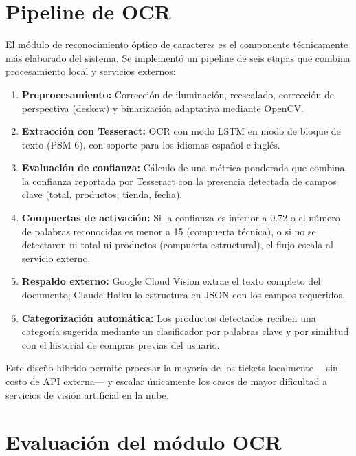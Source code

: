 \section{Pipeline de OCR}

El módulo de reconocimiento óptico de caracteres es el componente
técnicamente más elaborado del sistema. Se implementó un pipeline
de seis etapas que combina procesamiento local y servicios externos:

\begin{enumerate}
  \item \textbf{Preprocesamiento:} Corrección de iluminación,
    reescalado, corrección de perspectiva (deskew) y binarización
    adaptativa mediante OpenCV.
  \item \textbf{Extracción con Tesseract:} OCR con modo LSTM en
    modo de bloque de texto (PSM 6), con soporte para los idiomas
    español e inglés.
  \item \textbf{Evaluación de confianza:} Cálculo de una métrica
    ponderada que combina la confianza reportada por Tesseract con la
    presencia detectada de campos clave (total, productos, tienda, fecha).
  \item \textbf{Compuertas de activación:} Si la confianza es inferior
    a 0.72 o el número de palabras reconocidas es menor a 15
    (compuerta técnica), o si no se detectaron ni total ni productos
    (compuerta estructural), el flujo escala al servicio externo.
  \item \textbf{Respaldo externo:} Google Cloud Vision extrae el texto
    completo del documento; Claude Haiku lo estructura en JSON con los
    campos requeridos.
  \item \textbf{Categorización automática:} Los productos detectados
    reciben una categoría sugerida mediante un clasificador por palabras
    clave y por similitud con el historial de compras previas del usuario.
\end{enumerate}

Este diseño híbrido permite procesar la mayoría de los tickets
localmente —sin costo de API externa— y escalar únicamente los casos
de mayor dificultad a servicios de visión artificial en la nube.

\section{Evaluación del módulo OCR}

